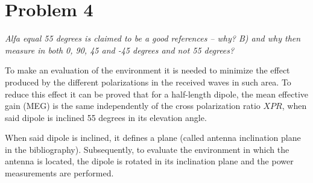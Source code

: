 \section{Problem 4}
\textit{Alfa equal 55 degrees is claimed to be a good references – why? B) and why then measure in both 0, 90, 45 and -45 degrees and not 55 degrees?}

To make an evaluation of the environment it is needed to minimize the effect produced by the different polarizations in the received waves in such area. To reduce this effect it can be proved that for a half-length dipole, the mean effective gain (MEG) is the same independently of the cross polarization ratio $XPR$, when said dipole is inclined 55 degrees in its elevation angle.

When said dipole is inclined, it defines a plane (called antenna inclination plane in the bibliography). Subsequently, to evaluate the environment in which the antenna is located, the dipole is rotated in its inclination plane and the power measurements are performed.